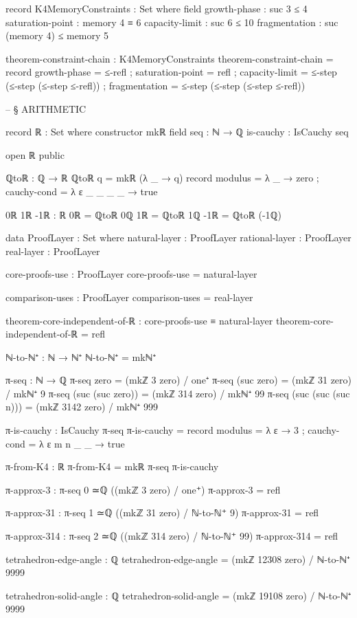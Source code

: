 \documentclass[11pt,a4paper]{book}
\begin{document}
\begin{code}
record K4MemoryConstraints : Set where
  field
    growth-phase     : suc 3 ≤ 4
    saturation-point : memory 4 ≡ 6
    capacity-limit   : suc 6 ≤ 10
    fragmentation    : suc (memory 4) ≤ memory 5

theorem-constraint-chain : K4MemoryConstraints
theorem-constraint-chain = record
  { growth-phase     = ≤-refl
  ; saturation-point = refl
  ; capacity-limit   = ≤-step (≤-step (≤-step ≤-refl))
  ; fragmentation    = ≤-step (≤-step (≤-step ≤-refl))
  }


-- § ARITHMETIC

record ℝ : Set where
  constructor mkℝ
  field
    seq : ℕ → ℚ
    is-cauchy : IsCauchy seq

open ℝ public

ℚtoℝ : ℚ → ℝ
ℚtoℝ q = mkℝ (λ _ → q) record 
  { modulus = λ _ → zero
  ; cauchy-cond = λ ε _ _ _ _ → true
  }

0ℝ 1ℝ -1ℝ : ℝ
0ℝ  = ℚtoℝ 0ℚ
1ℝ  = ℚtoℝ 1ℚ
-1ℝ = ℚtoℝ (-1ℚ)

data ProofLayer : Set where
  natural-layer  : ProofLayer
  rational-layer : ProofLayer
  real-layer     : ProofLayer

core-proofs-use : ProofLayer
core-proofs-use = natural-layer

comparison-uses : ProofLayer  
comparison-uses = real-layer

theorem-core-independent-of-ℝ : core-proofs-use ≡ natural-layer
theorem-core-independent-of-ℝ = refl

ℕ-to-ℕ⁺ : ℕ → ℕ⁺
ℕ-to-ℕ⁺ = mkℕ⁺

π-seq : ℕ → ℚ
π-seq zero              = (mkℤ 3 zero) / one⁺
π-seq (suc zero)        = (mkℤ 31 zero) / mkℕ⁺ 9
π-seq (suc (suc zero))  = (mkℤ 314 zero) / mkℕ⁺ 99
π-seq (suc (suc (suc n))) = (mkℤ 3142 zero) / mkℕ⁺ 999

π-is-cauchy : IsCauchy π-seq
π-is-cauchy = record
  { modulus = λ ε → 3
  ; cauchy-cond = λ ε m n _ _ → 
      true
  }

π-from-K4 : ℝ
π-from-K4 = mkℝ π-seq π-is-cauchy

π-approx-3 : π-seq 0 ≃ℚ ((mkℤ 3 zero) / one⁺)
π-approx-3 = refl

π-approx-31 : π-seq 1 ≃ℚ ((mkℤ 31 zero) / ℕ-to-ℕ⁺ 9)
π-approx-31 = refl

π-approx-314 : π-seq 2 ≃ℚ ((mkℤ 314 zero) / ℕ-to-ℕ⁺ 99)
π-approx-314 = refl

tetrahedron-edge-angle : ℚ
tetrahedron-edge-angle = (mkℤ 12308 zero) / ℕ-to-ℕ⁺ 9999

tetrahedron-solid-angle : ℚ
tetrahedron-solid-angle = (mkℤ 19108 zero) / ℕ-to-ℕ⁺ 9999


\end{code}
\end{document}

